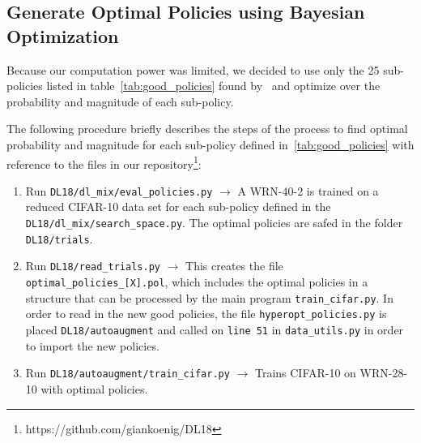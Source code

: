 \documentclass[10pt,twocolumn,letterpaper]{article}
\begin{document}

\subsection{Generate Optimal Policies using Bayesian Optimization}
Because our computation power was limited, we decided to use only the 25 sub-policies listed in table~\ref{tab:good_policies} found by~\cite{Ekin} and optimize over the probability and magnitude of each sub-policy.

The following procedure briefly describes the steps of the process to find optimal probability and magnitude for each sub-policy defined in~\ref{tab:good_policies} with reference to the files in our repository\footnote{https://github.com/giankoenig/DL18}:

\begin{enumerate}
\item Run \texttt{DL18/dl\_mix/eval\_policies.py} $\rightarrow$ A WRN-40-2 is trained on a reduced CIFAR-10 data set for each sub-policy defined in the \texttt{DL18/dl\_mix/search\_space.py}. The optimal policies are safed in the folder \texttt{DL18/trials}.
\item Run \texttt{DL18/read\_trials.py} $\rightarrow$ This creates the file \texttt{optimal\_policies\_[X].pol}, which includes the optimal policies in a structure that can be processed by the main program \texttt{train\_cifar.py}. In order to read in the new good policies, the file \texttt{hyperopt\_policies.py} is placed \texttt{DL18/autoaugment} and called on \texttt{line 51} in \texttt{data\_utils.py} in order to import the new policies.
\item Run \texttt{DL18/autoaugment/train\_cifar.py} $\rightarrow$  Trains CIFAR-10 on WRN-28-10 with optimal policies.
\end{enumerate}
\end{document}
